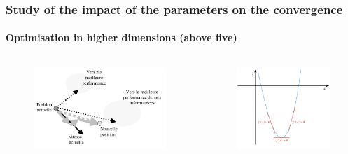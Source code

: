 \documentclass{beamer}
\begin{document}
\begin{frame}
	\frametitle{Study of the impact of the parameters on the convergence}
	\framesubtitle{Optimisation in higher dimensions (above five)}
		\begin{columns}
    		\column{7cm}
    			\begin{figure}
      				\centering
       				\includegraphics[scale=0.3]{dimension1.png}
			\end{figure}
   		 \column{5cm}
			\begin{figure}
 			\centering 
			\includegraphics[scale=0.3]{dimension2.png}
      			\end{figure}
 	 	\end{columns}
	\end{frame}
\end{document}

